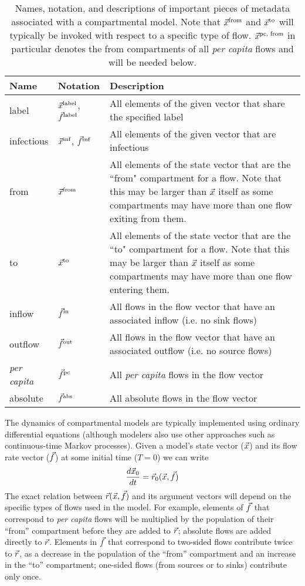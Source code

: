 \begin{table}
\centering
    \begin{tabular}{|m{1.5cm}|m{1.5cm}|m{30em}|}
        \hline
        Name & Notation & Description \\\hline
        label & $\vec{x}^{\text{label}}$, $\vec{f}^{\text{label}}$ & All elements of the given vector that share the specified label \\\hline
        infectious & $\vec{x}^{\text{inf}}$, $\vec{f}^{\text{inf}}$ & All elements of the given vector that are infectious \\\hline
        from & $\vec{x}^\text{from}$ & All elements of the state vector that are the ``from" compartment for a flow. Note that this may be larger than $\vec{x}$ itself as some compartments may have more than one flow exiting from them. \\\hline
        to & $\vec{x}^\text{to}$ & All elements of the state vector that are the ``to" compartment for a flow. Note that this may be larger than $\vec{x}$ itself as some compartments may have more than one flow entering them. \\\hline
        inflow & $\vec{f}^\text{in}$ & All flows in the flow vector that have an associated inflow (i.e. no sink flows) \\\hline
        outflow & $\vec{f}^\text{out}$ & All flows in the flow vector that have an associated outflow (i.e. no source flows) \\\hline
        \emph{per capita} & $\vec{f}^\text{pc}$ & All \emph{per capita} flows in the flow vector \\\hline
        absolute & $\vec{f}^\text{abs}$ & All absolute flows in the flow vector \\\hline
    \end{tabular}
    \caption{Names, notation, and descriptions of important pieces of metadata associated with a compartmental model. Note that $\vec{x}^\text{from}$ and $\vec{x}^\text{to}$ will typically be invoked with respect to a specific type of flow. $\vec{x}^\text{pc, from}$ in particular denotes the from compartments of all \emph{per capita} flows and will be needed below.}
    \label{tab:projections}
\end{table}


The dynamics of compartmental models are typically implemented using ordinary differential equations (although modelers also use other approaches such as continuous-time Markov processes).
Given a model's state vector ($\vec{x}$) and its flow rate vector ($\vec{f}$) at some initial time ($T=0$) we can write
\[
    \frac{d\vec{x}_0}{dt} = \vec{r}_0(\vec{x}, \vec{f})
\]
The exact relation between $\vec{r}(\vec{x}, \vec{f})$ and its argument vectors will depend on the specific types of flows used in the model. For example, elements of $\vec{f}$ that correspond to \emph{per capita} flows will be multiplied by the population of their ``from'' compartment before they are added to $\vec{r}$; absolute flows are added directly to $\vec{r}$. Elements in $\vec{f}$ that correspond to two-sided flows contribute twice to $\vec{r}$, as a decrease in the population of the ``from'' compartment and an increase in the ``to'' compartment; one-sided flows (from sources or to sinks) contribute only once.

